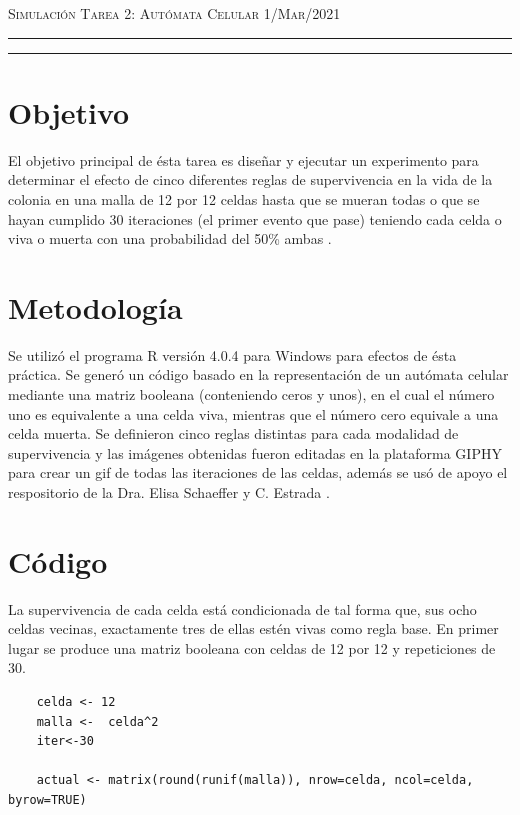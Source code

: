 \documentclass[12pt]{amsart}
\begin{document}
\pagestyle{empty}



\thispagestyle{empty}

{\scshape Simulación} \hfill {\scshape \Large Tarea 2: Autómata Celular} \hfill  {\scshape 1/Mar/2021}
\author{C. María Montemayor Palos}
\maketitle

\hrule
\hrule
\bigskip


\section{Objetivo}
El objetivo principal de ésta tarea es diseñar y ejecutar un experimento para determinar el efecto de cinco diferentes reglas de supervivencia en la vida de la colonia en una malla de 12 por 12 celdas hasta que se mueran todas o que se hayan cumplido 30 iteraciones (el primer evento que pase) teniendo cada celda o viva o muerta con una probabilidad del 50\% ambas \cite{Dra.Elisa}.

\section{Metodología}
Se utilizó el programa R versión 4.0.4 \cite{R} para Windows para efectos de ésta práctica. Se generó un código basado en la representación de un autómata celular mediante una matriz booleana (conteniendo ceros y unos), en el cual el número uno es equivalente a una celda viva, mientras que el número cero equivale a una celda muerta. Se definieron cinco reglas distintas para cada modalidad de  supervivencia y las imágenes obtenidas fueron editadas en la plataforma GIPHY \cite{GIPHY} para crear un gif de todas las iteraciones de las celdas, además se usó de apoyo el respositorio de la Dra. Elisa Schaeffer \cite{Dra.Elisa} y C. Estrada \cite{C.Estrada}.

\section{Código}
La supervivencia de cada celda está condicionada de tal forma que, sus ocho celdas vecinas, exactamente tres de ellas estén vivas como regla base.
En primer lugar se produce una matriz booleana con celdas de 12 por 12 y repeticiones de 30.
\begin{lstlisting}
    celda <- 12
    malla <-  celda^2
    iter<-30

    actual <- matrix(round(runif(malla)), nrow=celda, ncol=celda, byrow=TRUE)
\end{lstlisting}
\end{document}
